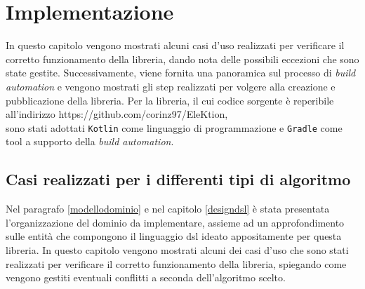 \documentclass[12pt,a4paper,openright,twoside]{book}
\begin{document}
\chapter{Implementazione}
In questo capitolo vengono mostrati alcuni casi d'uso realizzati per verificare il corretto funzionamento della libreria,
dando nota delle possibili eccezioni che sono state gestite.
Successivamente, viene fornita una panoramica sul processo di \textit{build automation} e
vengono mostrati gli step realizzati per volgere alla creazione e pubblicazione della libreria.
Per la libreria, il cui codice sorgente è reperibile all'indirizzo https://github.com/corinz97/EleKtion, \\
sono stati adottati \texttt{Kotlin} come linguaggio di programmazione
e \texttt{Gradle} come tool a supporto della \textit{build automation}.
\section{Casi realizzati per i differenti tipi di algoritmo}
Nel paragrafo \ref{modellodominio} e nel capitolo \ref{designdsl} è stata presentata l'organizzazione del dominio
da implementare, assieme ad un approfondimento sulle entità che compongono il linguaggio \ac{dsl}
ideato appositamente per questa libreria.
In questo capitolo vengono mostrati alcuni dei casi d'uso che sono stati realizzati per verificare il corretto funzionamento della libreria,
spiegando come vengono gestiti eventuali conflitti a seconda dell'algoritmo scelto.
\end{document}
